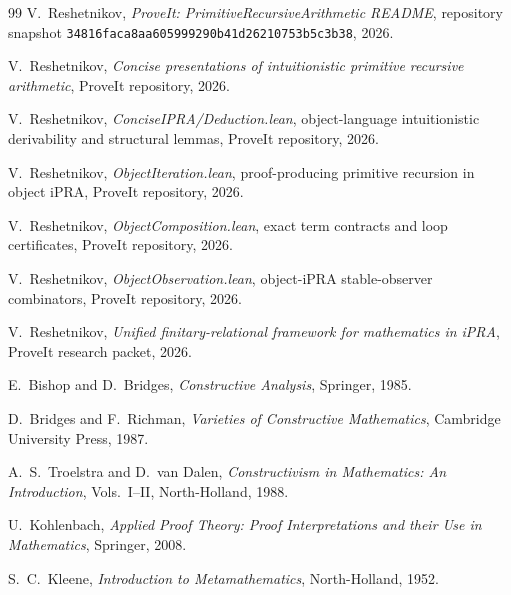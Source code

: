\documentclass[11pt,oneside]{article}
\theoremstyle{remark}
\begin{document}
\begin{thebibliography}{99}
V.~Reshetnikov, \emph{ProveIt: PrimitiveRecursiveArithmetic README}, repository snapshot \texttt{34816faca8aa605999290b41d26210753b5c3b38}, 2026.

V.~Reshetnikov, \emph{Concise presentations of intuitionistic primitive recursive arithmetic}, ProveIt repository, 2026.

V.~Reshetnikov, \emph{ConciseIPRA/Deduction.lean}, object-language intuitionistic derivability and structural lemmas, ProveIt repository, 2026.

V.~Reshetnikov, \emph{ObjectIteration.lean}, proof-producing primitive recursion in object iPRA, ProveIt repository, 2026.

V.~Reshetnikov, \emph{ObjectComposition.lean}, exact term contracts and loop certificates, ProveIt repository, 2026.

V.~Reshetnikov, \emph{ObjectObservation.lean}, object-iPRA stable-observer combinators, ProveIt repository, 2026.

V.~Reshetnikov, \emph{Unified finitary-relational framework for mathematics in iPRA}, ProveIt research packet, 2026.

E.~Bishop and D.~Bridges, \emph{Constructive Analysis}, Springer, 1985.

D.~Bridges and F.~Richman, \emph{Varieties of Constructive Mathematics}, Cambridge University Press, 1987.

A.~S.~Troelstra and D.~van Dalen, \emph{Constructivism in Mathematics: An Introduction}, Vols.~I--II, North-Holland, 1988.

U.~Kohlenbach, \emph{Applied Proof Theory: Proof Interpretations and their Use in Mathematics}, Springer, 2008.

S.~C.~Kleene, \emph{Introduction to Metamathematics}, North-Holland, 1952.
\end{thebibliography}
\end{document}
